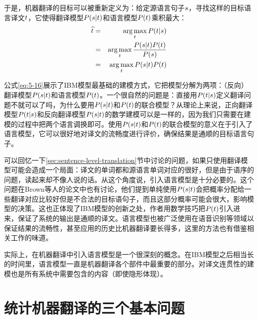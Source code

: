 于是，机器翻译的目标可以被重新定义为：给定源语言句子${s}$，寻找这样的目标语言译文${t}$，它使得翻译模型${P}({s}|{t})$和语言模型${P}({t})$乘积最大：
\begin{eqnarray}
\widehat{{t}} & = & \operatorname*{arg\,max}_{{t}} {P}({t}|{s}) \nonumber \\
          & = & \operatorname*{arg\,max}_{{t}} \frac{{P}({s}|{t}){P}({t})}{{P}({s})} \nonumber \\
          & = & \operatorname*{arg\,max}_{{t}} {P}({s}|{t}){P}({t})
\label{eq:5-16}
\end{eqnarray}

\parinterval 公式\eqref{eq:5-16}展示了IBM模型最基础的建模方式，它把模型分解为两项：（反向）翻译模型${P}({s}|{t})$和语言模型${P}({t})$。一个很自然的问题是：直接用${P}({t}|{s})$定义翻译问题不就可以了吗，为什么要用${P}({s}|{t})$和${P}({t})$的联合模型？从理论上来说，正向翻译模型${P}({t}|{s})$和反向翻译模型${P}({s}|{t})$的数学建模可以是一样的，因为我们只需要在建模的过程中把两个语言调换即可。使用${P}({s}|{t})$和${P}({t})$的联合模型的意义在于引入了语言模型，它可以很好地对译文的流畅度进行评价，确保结果是通顺的目标语言句子。

\parinterval 可以回忆一下\ref{sec:sentence-level-translation}节中讨论的问题，如果只使用翻译模型可能会造成一个局面：译文的单词都和源语言单词对应的很好，但是由于语序的问题，读起来却不像人说的话。从这个角度说，引入语言模型是十分必要的。这个问题在Brown等人的论文中也有讨论，他们提到单纯使用${P}({s}|{t})$会把概率分配给一些翻译对应比较好但是不合法的目标语句子，而且这部分概率可能会很大，影响模型的决策。这也正体现了IBM模型的创新之处，作者用数学技巧把${P}({t})$引入进来，保证了系统的输出是通顺的译文。语言模型也被广泛使用在语音识别等领域以保证结果的流畅性，甚至应用的历史比机器翻译要长得多，这里的方法也有借鉴相关工作的味道。

实际上，在机器翻译中引入语言模型是一个很深刻的概念。在IBM模型之后相当长的时间里，语言模型一直是机器翻译各个部件中最重要的部分。对译文连贯性的建模也是所有系统中需要包含的内容（即使隐形体现）。

\sectionnewpage
\section{统计机器翻译的三个基本问题}

